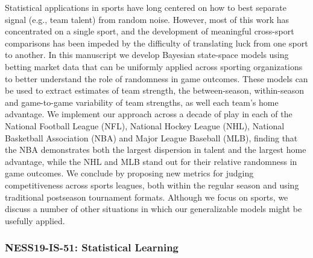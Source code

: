 \begin{itemize}
Statistical applications in sports have long centered on how to best separate signal (e.g., team talent) from random noise. However, most of this work has concentrated on a single sport, and the development of meaningful cross-sport comparisons has been impeded by the difficulty of translating luck from one sport to another. In this manuscript we develop Bayesian state-space models using betting market data that can be uniformly applied across sporting organizations to better understand the role of randomness in game outcomes. These models can be used to extract estimates of team strength, the between-season, within-season and game-to-game variability of team strengths, as well each team’s home advantage. We implement our approach across a decade of play in each of the National Football League (NFL), National Hockey League (NHL), National Basketball Association (NBA) and Major League Baseball (MLB), finding that the NBA demonstrates both the largest dispersion in talent and the largest home advantage, while the NHL and MLB stand out for their relative randomness in game outcomes. We conclude by proposing new metrics for judging competitiveness across sports leagues, both within the regular season and using traditional postseason tournament formats. Although we focus on sports, we discuss a number of other situations in which our generalizable models might be usefully applied.

\end{itemize}

\subsubsection*{NESS19-IS-51: Statistical Learning}

